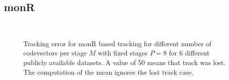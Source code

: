 \subsection{monR}
\begin{figure}[h!]
\centering
\\
\caption{Tracking error for monR based tracking for different number of codevectors per stage $M$ with fixed stages $P=8$ for 6 different publicly available datasets. A value of 50 means that track was lost.  The computation of the mean ignores the lost track case.}
\label{fig:results_final_monR}
\end{figure}

